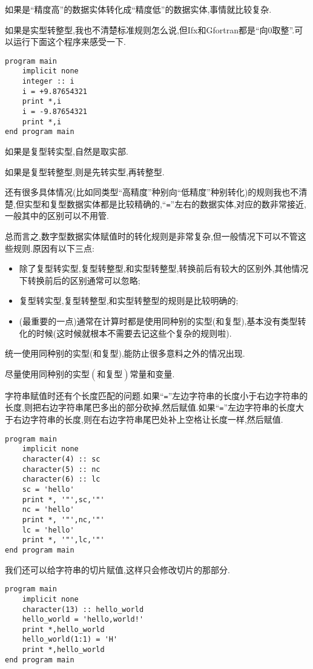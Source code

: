 如果是``精度高''的数据实体转化成``精度低''的数据实体,事情就比较复杂.

如果是实型转整型,我也不清楚标准规则怎么说,但Ifx和Gfortran都是``向0取整''.可以运行下面这个程序来感受一下.
\begin{lstlisting}
program main
    implicit none
    integer :: i
    i = +9.87654321
    print *,i
    i = -9.87654321
    print *,i
end program main
\end{lstlisting}

如果是复型转实型,自然是取实部.

如果是复型转整型,则是先转实型,再转整型.

还有很多具体情况(比如同类型``高精度''种别向``低精度''种别转化)的规则我也不清楚,但实型和复型数据实体都是比较精确的,``\texttt{=}''左右的数据实体,对应的数非常接近,一般其中的区别可以不用管.

总而言之,数字型数据实体赋值时的转化规则是非常复杂,但一般情况下可以不管这些规则.原因有以下三点:
\begin{itemize}
    \item 除了复型转实型,复型转整型,和实型转整型,转换前后有较大的区别外,其他情况下转换前后的区别通常可以忽略;
    \item 复型转实型,复型转整型,和实型转整型的规则是比较明确的;
    \item (最重要的一点)通常在计算时都是使用同种别的实型(和复型),基本没有类型转化的时候(这时候就根本不需要去记这些个复杂的规则啦).
\end{itemize}

统一使用同种别的实型(和复型),能防止很多意料之外的情况出现.

\begin{convention}\label{fortran_use_real}
    尽量使用同种别的实型$(\text{和复型})$常量和变量.
\end{convention}

字符串赋值时还有个长度匹配的问题.如果``\texttt{=}''左边字符串的长度小于右边字符串的长度,则把右边字符串尾巴多出的部分砍掉,然后赋值.如果``\texttt{=}''左边字符串的长度大于右边字符串的长度,则在右边字符串尾巴处补上空格让长度一样,然后赋值.
\begin{lstlisting}
program main
    implicit none
    character(4) :: sc
    character(5) :: nc
    character(6) :: lc
    sc = 'hello'
    print *, '"',sc,'"'
    nc = 'hello'
    print *, '"',nc,'"'
    lc = 'hello'
    print *, '"',lc,'"'
end program main
\end{lstlisting}
我们还可以给字符串的切片赋值,这样只会修改切片的那部分.
\begin{lstlisting}
program main
    implicit none
    character(13) :: hello_world
    hello_world = 'hello,world!'
    print *,hello_world
    hello_world(1:1) = 'H'
    print *,hello_world
end program main
\end{lstlisting}

